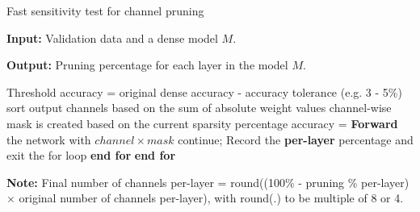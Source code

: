 \documentclass{article}
\begin{document}








\vspace{-2mm}
\begin{algorithm}
\caption{Fast sensitivity test for channel pruning}
\scriptsize
\textbf{Input:} Validation data and a dense model $M$.

\textbf{Output:} Pruning percentage for each layer in the model $M$. %
\begin{algorithmic}[1]
\State Threshold accuracy = original dense accuracy - accuracy tolerance (e.g. 3 - 5\%)
\State sort output channels based on the sum of absolute weight values %
\State channel-wise mask is created based on the current sparsity percentage
\State accuracy = \textbf{Forward} the network with $channel \times mask$
\State continue;
\Else 
\State Record the \textbf{per-layer} percentage and exit the for loop
\EndIf
\EndFor
\State \textbf{end for}
\EndFor
\State \textbf{end for}
\end{algorithmic}
\textbf{Note:} Final number of channels per-layer = round((100\% - pruning \% per-layer) $\times$ original number of channels per-layer), with round(.) to be multiple of 8 or 4. 

\label{alg:sensitiveytest}
\end{algorithm}
\vspace{-2mm}
\end{document}

